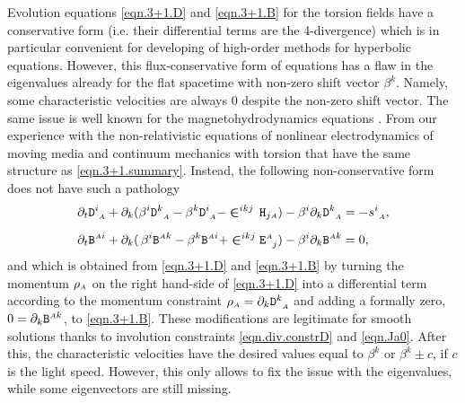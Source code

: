 \documentclass[
10pt, %
a4paper, %
oneside, %
headinclude,footinclude, %
BCOR5mm, %
]{scrartcl}
\newcommand{\sA}{\mathsmaller A}
\newcommand{\pd}[1]{\partial_{#1}}
\newcommand{\stress}[2]{s_{\ #1}^{#2}}
\newcommand{\Dfin}[2]{\mathtt{D}_{\phantom{#2}#1}^{#2}}	%
\newcommand{\Hfin}[2]{\mathtt{H}_{#2#1}}	%
\newcommand{\Efin}[2]{\mathtt{E}^{#1}_{\phantom{#1}#2}}	%
\newcommand{\Bfin}[2]{\mathtt{B}^{#1#2}}	%
\newcommand{\LCsymb}{\bm{\in}}    %
\newcommand{\shift}[1]{\beta^{#1}}
\begin{document}
Evolution equations \eqref{eqn.3+1.D} and \eqref{eqn.3+1.B} for the torsion fields have a 
conservative form (i.e. their differential 
terms are the 4-divergence) which is in particular convenient for developing of high-order methods 
for hyperbolic equations.
However, this flux-conservative form of equations has a flaw in the eigenvalues already for the 
flat spacetime with non-zero shift vector $ \shift{k} $. Namely, some characteristic velocities are 
always $ 0 $ despite the non-zero shift vector. The same issue is well known for the 
magnetohydrodynamics 
equations \cite{Powell1999}. From our experience with the non-relativistic equations 
of nonlinear electrodynamics of 
moving media \cite{DPRZ2017} and continuum mechanics with torsion \cite{Torsion2019} that have the 
same structure as \eqref{eqn.3+1.summary}. 
Instead, the following non-conservative form does not have 
such a pathology
\begin{subequations}\label{eqn.BD.alt}
	\begin{align}
		\pd{t} \Dfin{\sA}{i} + \pd{k}(\shift{i} 
		\Dfin{\sA}{k} - \shift{k}\Dfin{\sA}{i}  - \LCsymb^{ikj} \,
		\Hfin{\sA}{j}) 
		-\shift{i}\pd{k} \Dfin{\sA}{k}
		& 
		= - \stress{\sA}{i},
		\label{eqn.BD.alt.D}
		\\[2mm]
		\pd{t} \Bfin{\sA}{i} + \pd{k}(\,\shift{i} 
		\Bfin{\sA}{k} - \shift{k}\Bfin{\sA}{i}  + \LCsymb^{ikj} 
		\Efin{\sA}{j}) 
		-\shift{i}\pd{k} \Bfin{\sA}{k}
		& 
		= 0,
		\label{eqn.BD.alt.B}
	\end{align}
\end{subequations}
and which is obtained from \eqref{eqn.3+1.D} and \eqref{eqn.3+1.B} by turning the momentum $ \rho_\sA 
$ on the right hand-side of \eqref{eqn.3+1.D} into a differential term according to the momentum 
constraint $ 
\rho_\sA = \pd{k}\Dfin{\sA}{k} $ and adding a formally zero, $ 0 = \pd{k}\Bfin{\sA}{k} $, to 
\eqref{eqn.3+1.B}. These modifications are legitimate for smooth solutions thanks to involution 
constraints \eqref{eqn.div.constrD} and \eqref{eqn.Ja0}. After this, the characteristic velocities 
have the desired values equal to $ \shift{k} $ or $ \shift{k} \pm c $, if $ c $ is the light 
speed. 
However, this only allows to fix the issue with the eigenvalues, while some eigenvectors are still 
missing.
\end{document}
